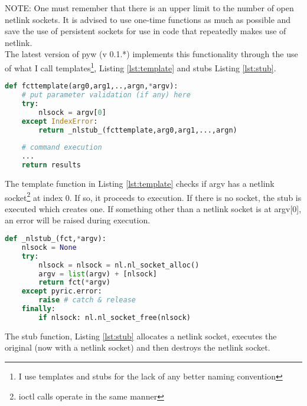 \documentclass[11pt]{article}
\begin{document}
NOTE: One must remember that there is an upper limit to the number of open netlink
sockets. It is advised to use one-time functions as much as possible and save the
use of persistent sockets for use in code that repeatedly makes use of netlink. \\

The latest version of pyw (v 0.1.*) implements this functionality through the 
use of what I call templates\footnote{I use templates and stubs for the lack
of any better naming convention}, Listing \ref{lst:template} and stubs Listing 
\ref{lst:stub}.

\begin{lstlisting}[caption={A Basic Netlink Function Template},
                   label={lst:template},
                   language=Python]
def fcttemplate(arg0,arg1,..,argn,*argv):
    # put parameter validation (if any) here
    try:
        nlsock = argv[0]
    except IndexError:
        return _nlstub_(fcttemplate,arg0,arg1,...,argn)
        
    # command execution
    ...
    return results
\end{lstlisting}

The template function in Listing \ref{lst:template} checks if argv has a netlink
socket\footnote{ioctl calls operate in the same manner} at index 0. If so, it
proceeds to execution. If there is no socket, the stub is executed which creates 
one. If something other than a netlink socket is at argv[0], an error will be 
raised during execution. \\

\begin{lstlisting}[caption={Function \_nlstub\_},
                   label={lst:stub},
                   language=Python]
def _nlstub_(fct,*argv):
    nlsock = None
    try:
        nlsock = nlsock = nl.nl_socket_alloc()
        argv = list(argv) + [nlsock]
        return fct(*argv)
    except pyric.error: 
        raise # catch & release
    finally:
        if nlsock: nl.nl_socket_free(nlsock)
\end{lstlisting}

The stub function, Listing \ref{lst:stub} allocates a netlink socket, executes
the original (now with a netlink socket) and then destroys the netlink socket.\\
\end{document}
